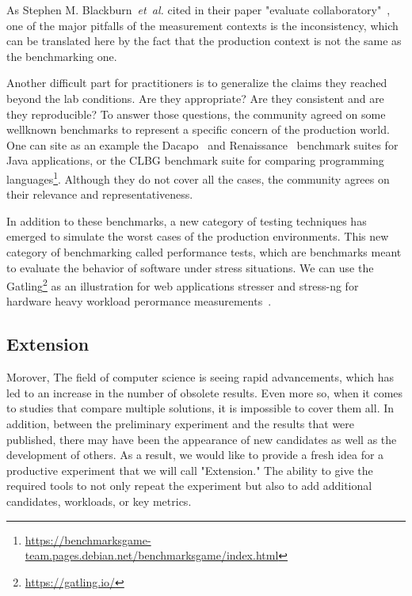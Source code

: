 As Stephen M. Blackburn~\emph{et~al.} cited in their paper "evaluate collaboratory"~\cite{stephen_evaluate_2012}, one of the major pitfalls of the measurement contexts is the inconsistency, which can be translated here by the fact that the production context is not the same as the benchmarking one.

Another difficult part for practitioners is to generalize the claims they reached beyond the lab conditions.
Are they appropriate?
Are they consistent and are they reproducible?
To answer those questions, the community agreed on some wellknown benchmarks to represent a specific concern of the production world.
One can site as an example the Dacapo~\cite{DaCapo:paper} and Renaissance~\cite{renaissance} benchmark suites for Java applications, or the CLBG benchmark suite for comparing programming languages\footnote{\url{https://benchmarksgame-team.pages.debian.net/benchmarksgame/index.html}}.
Although they do not cover all the cases, the community agrees on their relevance and representativeness.

In addition to these benchmarks, a new category of testing techniques has emerged to simulate the worst cases of the production environments. This new category of benchmarking called performance tests\cite{pradeep2019pragmatic}, which are benchmarks meant to evaluate the behavior of software under stress situations. We can use the Gatling\footnote{\url{https://gatling.io/}} as an illustration for web applications stresser and stress-ng for hardware heavy workload perormance measurements~\cite{king2017stress}.







\subsection{Extension}
Morover, The field of computer science is seeing rapid advancements, which has led to an increase in the number of obsolete results. Even more so, when it comes to studies that compare multiple solutions, it is impossible to cover them all.
In addition, between the preliminary experiment and the results that were published, there may have been the appearance of new candidates as well as the development of others. As a result, we would like to provide a fresh idea for a productive experiment that we will call "Extension." The ability to give the required tools to not only repeat the experiment but also to add additional candidates, workloads, or key metrics.


